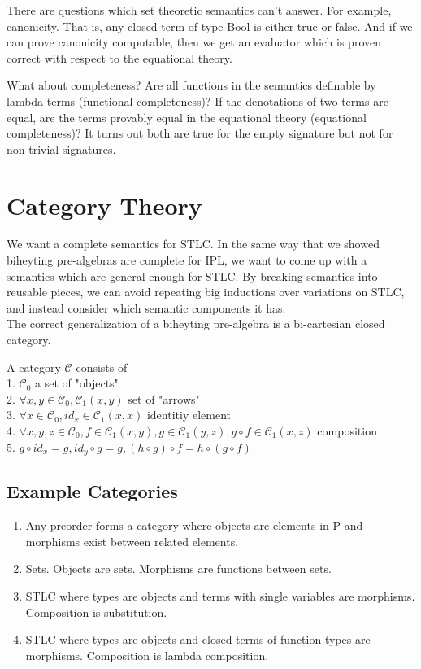 \documentclass[12pt]{article}
\begin{document}
There are questions which set theoretic semantics can't answer. For example, canonicity. That is, any closed term of type Bool is either true or false. And if we can prove canonicity computable, then we get an evaluator which is proven correct with respect to the equational theory. 

What about completeness? Are all functions in the semantics definable by lambda terms (functional completeness)? If the denotations of two terms are equal, are the terms provably equal in the equational theory (equational completeness)? It turns out both are true for the empty signature but not for non-trivial signatures. 

\newpage
\section{Category Theory}
We want a complete semantics for STLC. In the same way that we showed biheyting pre-algebras are complete for IPL, we want to come up with a semantics which are general enough for STLC. By breaking semantics into reusable pieces, we can avoid repeating big inductions over variations on STLC, and instead consider which semantic components it has. \\

The correct generalization of a biheyting pre-algebra is a bi-cartesian closed category. 

{
A category $\mathcal{C}$ consists of}\\
1. $\mathcal{C}_0$ a set of "objects"\\
2. $\forall x, y \in \mathcal{C}_0, \mathcal{C}_1(x, y)$ set of "arrows"\\
3. $\forall x \in \mathcal{C}_0, id_x \in \mathcal{C}_1(x, x)$ identitiy element\\
4. $\forall x, y, z \in \mathcal{C}_0, f \in \mathcal{C}_1(x, y), g \in \mathcal{C}_1(y, z), g \circ f \in \mathcal{C}_1(x, z)$ composition\\
5. $g \circ id_x = g, id_y \circ g = g, (h \circ g) \circ f = h \circ (g \circ f)$\\

\subsection{Example Categories}
\begin{enumerate}
\item Any preorder forms a category where objects are elements in P and morphisms exist between related elements.
\item Sets. Objects are sets. Morphisms are functions between sets. 
\item STLC where types are objects and terms with single variables are morphisms. Composition is substitution.
\item STLC where types are objects and closed terms of function types are morphisms. Composition is lambda composition.

\end{enumerate}
\end{document}
